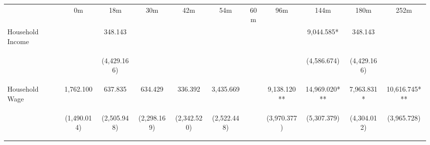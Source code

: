 \begin{tabular}{lcccccccccc}
\hline \noalign{\smallskip} & 0m & 18m & 30m & 42m & 54m & 60m & 96m & 144m & 180m & 252m\\
\noalign{\smallskip}\hline \noalign{\smallskip}Household Income &  & 348.143 &  &  &  &  &  & 9,044.585* & 348.143 & \\
 & \begin{footnotesize}\end{footnotesize} & \begin{footnotesize}(4,429.166)\end{footnotesize} & \begin{footnotesize}\end{footnotesize} & \begin{footnotesize}\end{footnotesize} & \begin{footnotesize}\end{footnotesize} & \begin{footnotesize}\end{footnotesize} & \begin{footnotesize}\end{footnotesize} & \begin{footnotesize}(4,586.674)\end{footnotesize} & \begin{footnotesize}(4,429.166)\end{footnotesize} & \begin{footnotesize}\end{footnotesize}\\
\noalign{\smallskip}Household Wage & 1,762.100 & 637.835 & 634.429 & 336.392 & 3,435.669 &  & 9,138.120** & 14,969.020*** & 7,963.831* & 10,616.745***\\
 & \begin{footnotesize}(1,490.014)\end{footnotesize} & \begin{footnotesize}(2,505.948)\end{footnotesize} & \begin{footnotesize}(2,298.169)\end{footnotesize} & \begin{footnotesize}(2,342.520)\end{footnotesize} & \begin{footnotesize}(2,522.448)\end{footnotesize} & \begin{footnotesize}\end{footnotesize} & \begin{footnotesize}(3,970.377)\end{footnotesize} & \begin{footnotesize}(5,307.379)\end{footnotesize} & \begin{footnotesize}(4,304.012)\end{footnotesize} & \begin{footnotesize}(3,965.728)\end{footnotesize}\\

\end{tabular}
